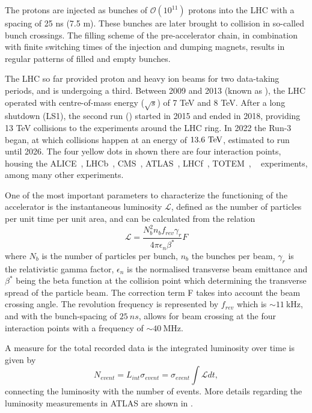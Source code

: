 The protons are injected as bunches of \(\mathcal{O}(10^{11})\) protons into the \ac{LHC} with a spacing of 25 ns (7.5 m). These bunches are later brought to collision in so-called bunch crossings. The filling scheme of the pre-accelerator chain, in combination with finite switching times of the injection and dumping magnets, results in regular patterns of filled and empty bunches.

The \ac{LHC} so far provided proton and heavy ion beams for two data-taking periods, and is undergoing a third. Between 2009 and 2013 (known as \RunOne), the \ac{LHC} operated with centre-of-mass energy ($\sqrt{s}$) of 7 TeV and 8 TeV.  After a long shutdown (LS1), the second run (\RunTwo) started in 2015 and ended in 2018, providing 13 TeV collisions to the experiments around the \ac{LHC} ring. In 2022 the Run-3 began, at which \pp collisions happen at an energy of \(13.6~\text{TeV}\), estimated to run until 2026.
The four yellow dots in shown \Fig{\ref{fig:atlas:lhc:lhc}} there are four interaction points, housing the \acs{ALICE}~\cite{ALICE}, \acs{LHCb}~\cite{LHCb}, \acs{CMS}~\cite{CMS}, \acs{ATLAS}~\cite{ATLAS}, \acs{LHCf}~\cite{LHCf}, \acs{TOTEM}~\cite{TOTEM}, ~\cite{MoEDAL} experiments, among many other experiments.


One of the most important parameters to characterize the functioning of the accelerator is the instantaneous luminosity \(\mathcal{L}\), defined as the number of particles per unit time per unit area, and can be calculated from the relation
\begin{equation}
    \mathcal{L} = \frac{N_b^ 2n_b f_{rev}\gamma_r}{4\pi\epsilon_n\beta^*}F
    \label{eq:atlas:LHC:instantaneous_lumi}
\end{equation}
where $N_b$ is the number of particles per bunch, $n_b$ the bunches per beam, $\gamma_r$ is the relativistic gamma factor, $\epsilon_n$ is the normalised transverse beam emittance and $\beta^*$ being the beta function at the collision point which determining the transverse spread of the particle beam. The correction term F takes into account the beam crossing angle. The revolution frequency is represented by $f_{rev}$ which is \(\sim 11~\)kHz, and with the bunch-spacing of \(25~ns\), allows for beam crossing at the four interaction points with a frequency of \(\sim 40~\)MHz. 

A measure for the total recorded data is the integrated luminosity over time is given by
\begin{equation}
    N_{event} = L_{int} \sigma_{event} = \sigma_{event} \int \mathcal{L} dt,
    \label{eq:atlas:LHC:integrated_lumi}
\end{equation}
connecting the luminosity with the number of events. More details regarding the luminosity measurements in \ac{ATLAS} are shown in \Sect{\ref{sec:atlas:runs}}.








